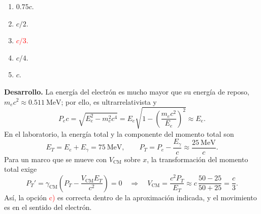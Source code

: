 \documentclass[a4paper,11pt]{article}
\begin{document}
\begin{enumerate}
    \item $0.75c$.
    \item $c/2$.
    \item \textcolor{red}{$c/3$.}
    \item $c/4$.
    \item $c$.
\end{enumerate}

\begin{figure}[H]
\centering

\end{figure}

\textbf{Desarrollo.} La energía del electrón es mucho mayor que su energía de reposo, $m_ec^2\approx0.511\ \mathrm{MeV}$; por ello, es ultrarrelativista y
\[
P_ec=\sqrt{E_e^2-m_e^2c^4}
=E_e\sqrt{1-\left(\frac{m_ec^2}{E_e}\right)^2}
\approx E_e.
\]
En el laboratorio, la energía total y la componente del momento total son
\[
E_T=E_e+E_\gamma=75\ \mathrm{MeV},\qquad
P_T=P_e-\frac{E_\gamma}{c}\approx\frac{25\ \mathrm{MeV}}{c}.
\]
Para un marco que se mueve con $V_{\mathrm{CM}}$ sobre $x$, la transformación del momento total exige
\[
P_T'=\gamma_{\mathrm{CM}}\left(P_T-\frac{V_{\mathrm{CM}}E_T}{c^2}\right)=0
\quad\Longrightarrow\quad
\boxed{V_{\mathrm{CM}}=\frac{c^2P_T}{E_T}
\approx c\,\frac{50-25}{50+25}=\frac{c}{3}}.
\]
Así, la opción \textcolor{red}{c)} es correcta dentro de la aproximación indicada, y el movimiento es en el sentido del electrón.
\parencite[Sec. 5.4, pp. 158--159]{chaparro2026}

\printbibliography[title={Referencia}]
\end{document}
